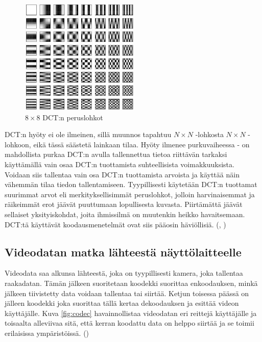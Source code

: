 \begin{figure}[ht]
	\centering
	\includegraphics[width=0.5\textwidth]{dct.jpg}
	\caption{$8 \times 8$ DCT:n peruslohkot}
	\label{fig:dct}
\end{figure}

DCT:n hyöty ei ole ilmeinen, sillä muunnos tapahtuu $N \times N$ -lohkosta
$N \times N$ -lohkoon, eikä tässä säästetä lainkaan  tilaa. Hyöty ilmenee
purkuvaiheessa - on mahdollista purkaa DCT:n avulla tallennettua tietoa
riittävän tarkaksi käyttämällä vain osaa DCT:n tuottamista suhteellisista
voimakkuuksista. Voidaan siis tallentaa vain osa DCT:n tuottamista arvoista
ja käyttää näin vähemmän tilaa tiedon tallentamiseen. Tyypillisesti käytetään
DCT:n tuottamat suurimmat arvot eli merkityksellisimmät peruslohkot, jolloin
harvinaisemmat ja räikeimmät erot jäävät puuttumaan lopullisesta kuvasta.
Piirtämättä jäävät sellaiset yksityiskohdat, joita ihmissilmä on muutenkin
heikko havaitsemaan. DCT:tä käyttävät koodausmenetelmät ovat siis pääosin
häviöllisiä. (\citealt{h264}, \citealt{du})

\subsection{Videodatan matka lähteestä näyttölaitteelle}

Videodata saa alkunsa lähteestä, joka on tyypillisesti kamera, joka tallentaa
raakadatan. Tämän jälkeen suoritetaan koodekki suorittaa enkoodauksen, minkä
jälkeen tiivistetty data voidaan tallentaa tai siirtää. Ketjun toisessa
päässä on jälleen koodekki joka suorittaa tällä kertaa dekoodauksen ja esittää
videon käyttäjälle. Kuva \ref{fig:codec} havainnollistaa videodatan eri reittejä
käyttäjälle ja toisaalta alleviivaa sitä, että kerran koodattu data on helppo
siirtää ja se toimii erilaisissa ympäristöissä. (\citealt{h264})

